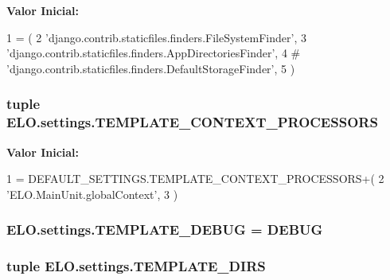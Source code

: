 {\bfseries Valor Inicial\-:}
\begin{DoxyCode}
1 = (
2     \textcolor{stringliteral}{'django.contrib.staticfiles.finders.FileSystemFinder'},
3     \textcolor{stringliteral}{'django.contrib.staticfiles.finders.AppDirectoriesFinder'},
4 \textcolor{comment}{#    'django.contrib.staticfiles.finders.DefaultStorageFinder',}
5 )
\end{DoxyCode}
\hypertarget{namespaceELO_1_1settings_ad62b51880946e9380913c2f3811311bf}{
\subsubsection[{T\-E\-M\-P\-L\-A\-T\-E\-\_\-\-C\-O\-N\-T\-E\-X\-T\-\_\-\-P\-R\-O\-C\-E\-S\-S\-O\-R\-S}]{\setlength{\rightskip}{0pt plus 5cm}tuple E\-L\-O.\-settings.\-T\-E\-M\-P\-L\-A\-T\-E\-\_\-\-C\-O\-N\-T\-E\-X\-T\-\_\-\-P\-R\-O\-C\-E\-S\-S\-O\-R\-S}}\label{namespaceELO_1_1settings_ad62b51880946e9380913c2f3811311bf}
{\bfseries Valor Inicial\-:}
\begin{DoxyCode}
1 = DEFAULT\_SETTINGS.TEMPLATE\_CONTEXT\_PROCESSORS+(
2     \textcolor{stringliteral}{'ELO.MainUnit.globalContext'},
3 )
\end{DoxyCode}
\hypertarget{namespaceELO_1_1settings_a014930e0bf77feccc65c20212593381e}{
\subsubsection[{T\-E\-M\-P\-L\-A\-T\-E\-\_\-\-D\-E\-B\-U\-G}]{\setlength{\rightskip}{0pt plus 5cm}E\-L\-O.\-settings.\-T\-E\-M\-P\-L\-A\-T\-E\-\_\-\-D\-E\-B\-U\-G = {\bf D\-E\-B\-U\-G}}}\label{namespaceELO_1_1settings_a014930e0bf77feccc65c20212593381e}
\hypertarget{namespaceELO_1_1settings_a4e977a41e98923ee4c93b24d22b3d7e2}{
\subsubsection[{T\-E\-M\-P\-L\-A\-T\-E\-\_\-\-D\-I\-R\-S}]{\setlength{\rightskip}{0pt plus 5cm}tuple E\-L\-O.\-settings.\-T\-E\-M\-P\-L\-A\-T\-E\-\_\-\-D\-I\-R\-S}}\label{namespaceELO_1_1settings_a4e977a41e98923ee4c93b24d22b3d7e2}
